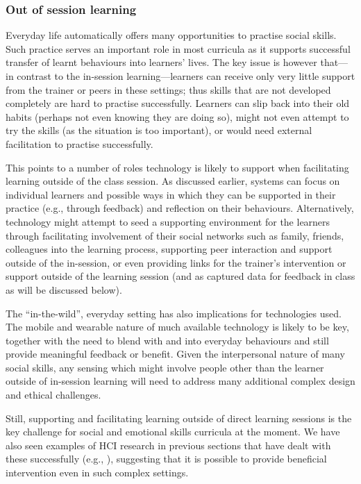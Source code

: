 \documentclass[prodmode,acmtochi]{acmsmall}
\newcommand{\todo}[1]{\textrm{\textrm{\textcolor{LightBlue}{[[#1]]} } } }
\begin{document}
\subsubsection{Out of session learning}
Everyday life automatically offers many opportunities to practise social skills. Such practice serves an important role in most curricula as it supports successful transfer of learnt behaviours into learners' lives. 
%
The key issue is however that---in contrast to the in-session learning---learners can receive only very little support from the trainer or peers in these settings; thus skills that are not developed completely are hard to practise successfully. Learners can slip back into their old habits (perhaps not even knowing they are doing so), might not even attempt to try the skills (as the situation is too important), or would need external facilitation to practise successfully.  

This points to a number of roles technology is likely to support when facilitating learning outside of the class session. As discussed earlier, systems can focus on individual learners and possible ways in which they can be supported in their practice (e.g., through feedback) and reflection on their behaviours. Alternatively, technology might attempt to seed a supporting environment for the learners through facilitating involvement of their social networks such as family, friends, colleagues into the learning process, supporting peer interaction and support outside of the in-session, or even providing links for the trainer's intervention or support outside of the learning session (and as captured data for feedback in class as will be discussed below). 

The ``in-the-wild'', everyday setting has also implications for technologies used. The mobile and wearable nature of much available technology is likely to be key, together with the need to blend with and into everyday behaviours %
and still provide meaningful feedback or benefit. Given the interpersonal nature of many social skills, any sensing which might involve people other than the learner outside of in-session learning will need to address many additional complex design and ethical challenges. 

Still, supporting and facilitating learning outside of direct learning sessions is the key challenge for social and emotional skills curricula at the moment. We have also seen examples of HCI research in previous sections that have dealt with these successfully (e.g., \cite{Escobedo2012,Tentori2010,Matthews2011}), suggesting that it is possible to provide beneficial intervention even in such complex settings. 
\end{document}
